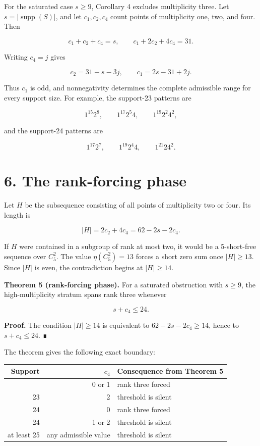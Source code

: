 \documentclass[
  11pt,
]{article}
\begin{document}
For the saturated case \(s\ge9\), Corollary 4 excludes multiplicity
three. Let \(s=|\operatorname{supp}(S)|\), and let \(c_1, c_2, c_4\)
count points of multiplicity one, two, and four. Then

\[
c_1+c_2+c_4=s,
\qquad
c_1+2c_2+4c_4=31.
\]

Writing \(c_4=j\) gives

\[
c_2=31-s-3j,
\qquad
c_1=2s-31+2j.
\]

Thus \(c_1\) is odd, and nonnegativity determines the complete
admissible range for every support size. For example, the support-23
patterns are

\[
1^{15}2^8, \qquad 1^{17}2^5 4, \qquad 1^{19}2^2 4^2,
\]

and the support-24 patterns are

\[
1^{17}2^7, \qquad 1^{19}2^4 4, \qquad 1^{21}2 4^2.
\]

\hypertarget{the-rank-forcing-phase}{%
\section{6. The rank-forcing phase}\label{the-rank-forcing-phase}}

Let \(H\) be the subsequence consisting of all points of multiplicity
two or four. Its length is

\[
|H|=2c_2+4c_4=62-2s-2c_4.
\]

If \(H\) were contained in a subgroup of rank at most two, it would be a
5-short-free sequence over \(C_5^2\). The value \(\eta(C_5^2)=13\)
forces a short zero sum once \(|H|\ge13\). Since \(|H|\) is even, the
contradiction begins at \(|H|\ge14\).

\textbf{Theorem 5 (rank-forcing phase).} For a saturated obstruction
with \(s\ge9\), the high-multiplicity stratum spans rank three whenever

\[
s+c_4\le24.
\]

\textbf{Proof.} The condition \(|H|\ge14\) is equivalent to
\(62-2s-2c_4\ge14\), hence to \(s+c_4\le24\). ∎

The theorem gives the following exact boundary:

\begin{longtable}[]{@{}rrl@{}}
\toprule\noalign{}
Support & \(c_4\) & Consequence from Theorem 5 \\
\midrule\noalign{}
\endhead
\bottomrule\noalign{}
\endlastfoot
23 & 0 or 1 & rank three forced \\
23 & 2 & threshold is silent \\
24 & 0 & rank three forced \\
24 & 1 or 2 & threshold is silent \\
at least 25 & any admissible value & threshold is silent \\
\end{longtable}
\end{document}
